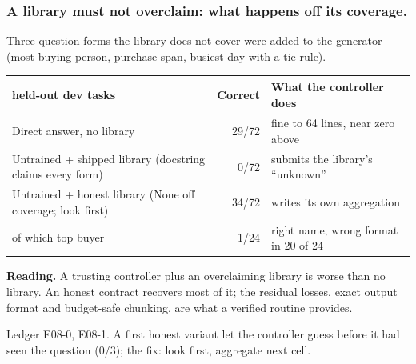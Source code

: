 \documentclass[aspectratio=169,11pt]{beamer}
\newcommand{\source}[1]{\vfill{\scriptsize\color{Gray}#1\par}}
\begin{document}
\begin{frame}[t]
\frametitle{A library must not overclaim: what happens off its coverage.}
Three question forms the library does not cover were added to the generator (most-buying person,
purchase span, busiest day with a tie rule).
\medskip
\begin{center}\footnotesize
\begin{tabular}{@{}>{\raggedright\arraybackslash}p{}r>{\raggedright\arraybackslash}p{}@{}}
\toprule
72 held-out dev tasks & Correct & What the controller does \\
\midrule
Direct answer, no library & 29/72 & fine to 64 lines, near zero above \\
Untrained + shipped library (docstring claims every form) & \alert{0/72} & submits the library's ``unknown'' \\
Untrained + honest library (None off coverage; look first) & 34/72 & writes its own aggregation \\
\quad of which top buyer & 1/24 & right name, wrong format in 20 of 24 \\
\bottomrule
\end{tabular}
\end{center}
\textbf{Reading.} A trusting controller plus an overclaiming library is worse than no library. An honest
contract recovers most of it; the residual losses, exact output format and budget-safe chunking, are
what a verified routine provides.
\source{Ledger E08-0, E08-1. A first honest variant let the controller guess before it had seen the question (0/3); the fix: look first, aggregate next cell.}
\end{frame}
\end{document}
